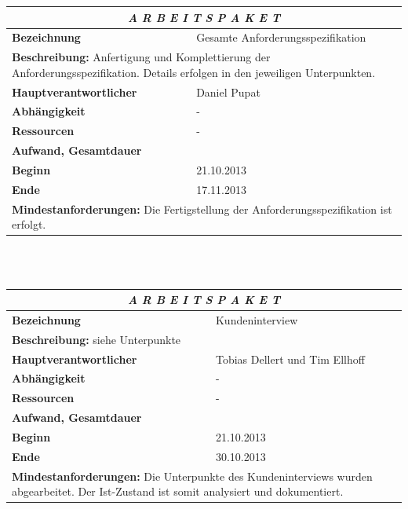 \documentclass[fontsize=12pt,paper=a4,twoside]{scrartcl}
\begin{document}
\begin{tabular}{p{7.5cm}|p{7.5cm}}\toprule
\multicolumn{2}{c}{\textbf{\textit{A R B E I T S P A K E T \quad 2}}} \\ \toprule \hline
\textbf{Bezeichnung} & Gesamte Anforderungsspezifikation\\\hline
\multicolumn{2}{p{15cm}}{\textbf{Beschreibung:} \newline 
Anfertigung und Komplettierung der Anforderungsspezifikation. Details erfolgen in den jeweiligen Unterpunkten.}  \\\hline
\textbf{Hauptverantwortlicher} & Daniel Pupat\\\hline
\textbf{Abhängigkeit} & -\\\hline
\textbf{Ressourcen} & -\\\hline
\textbf{Aufwand, Gesamtdauer} & \\\hline
\textbf{Beginn} & 21.10.2013 \\\hline
\textbf{Ende} & 17.11.2013\\\hline
\multicolumn{2}{p{15cm}}{\textbf{Mindestanforderungen: } \newline
Die Fertigstellung der Anforderungsspezifikation ist erfolgt.}  \\ \toprule
\end{tabular} \\\\

\begin{tabular}{p{7.5cm}|p{7.5cm}}\toprule
\multicolumn{2}{c}{\textbf{\textit{A R B E I T S P A K E T \quad 2.1}}} \\ \toprule \hline
\textbf{Bezeichnung} & Kundeninterview\\\hline
\multicolumn{2}{p{15cm}}{\textbf{Beschreibung:} \newline 
siehe Unterpunkte}  \\\hline
\textbf{Hauptverantwortlicher} & Tobias Dellert und Tim Ellhoff\\\hline
\textbf{Abhängigkeit} & -\\\hline
\textbf{Ressourcen} & -\\\hline
\textbf{Aufwand, Gesamtdauer} & \\\hline
\textbf{Beginn} & 21.10.2013 \\\hline
\textbf{Ende} & 30.10.2013\\\hline
\multicolumn{2}{p{15cm}}{\textbf{Mindestanforderungen: } \newline
Die Unterpunkte des Kundeninterviews wurden abgearbeitet. Der Ist-Zustand ist somit analysiert und dokumentiert.}  \\ \toprule
\end{tabular} \\\\
\end{document}
